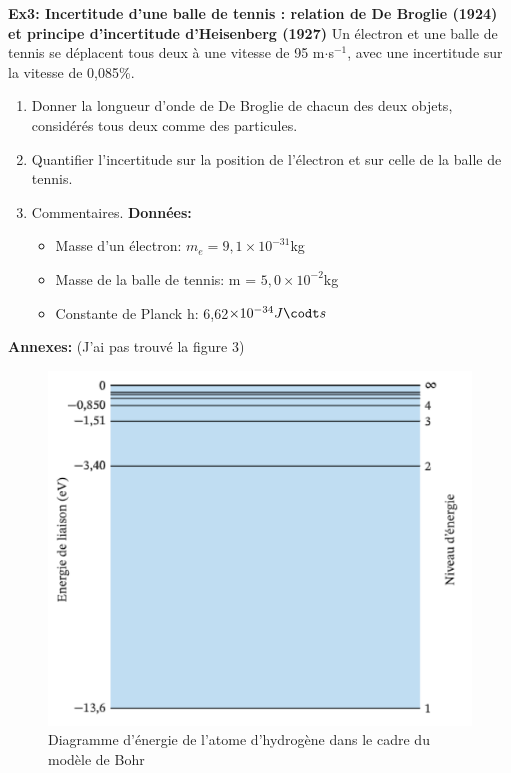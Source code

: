 \documentclass{article}
\begin{document}
\noindent\textbf{Ex3: Incertitude d'une balle de tennis : relation de De Broglie (1924) et principe d'incertitude d'Heisenberg (1927)}\newline
\indent Un électron et une balle de tennis se déplacent tous deux à une vitesse de 95 m$\cdot$s$^{-1}$, avec une incertitude sur la vitesse de 0,085\%.
\begin{enumerate}
    \item Donner la longueur d'onde de De Broglie de chacun des deux objets, considérés tous deux comme des particules.
    \item Quantifier l'incertitude sur la position de l'électron et sur celle de la balle de tennis.
    \item Commentaires.\newline
    \textbf{Données:}
    \begin{itemize}
        \item Masse d'un électron: $m_{e}=9,1\times 10^{-31}$kg
        \item Masse de la balle de tennis: m = $5,0\times 10^{-2}$kg
        \item Constante de Planck h: 6,62$\times 10^{-34} J\codt s$
    \end{itemize}
\end{enumerate}
\newpage
\noindent\textbf{Annexes:}\newline
(J'ai pas trouvé la figure 3)
\begin{figure}[h]
    \centering
    \includegraphics[scale=0.5]{figure2.png}
    \caption{Diagramme d'énergie de l'atome d'hydrogène dans le cadre du modèle de Bohr}
\end{figure}
\end{document}
